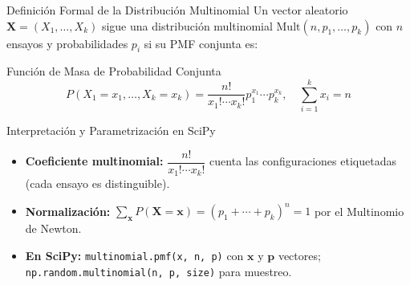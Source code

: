 \documentclass[10pt, aspectratio=169]{beamer}
\begin{document}
\begin{frame}{Definición Formal de la Distribución Multinomial}
  \footnotesize
  Un vector aleatorio $\bm{X} = (X_{1}, \dots, X_{k})$ sigue una distribución multinomial $\text{Mult}(n, p_{1}, \dots, p_{k})$ con $n$ ensayos y probabilidades $p_{i}$ si su PMF conjunta es: \pause

  \vspace{0.1cm}
  \begin{block}{Función de Masa de Probabilidad Conjunta}
    $$P(X_{1} = x_{1}, \dots, X_{k} = x_{k}) = \dfrac{n!}{x_{1}! \cdots x_{k}!} p_{1}^{x_{1}} \cdots p_{k}^{x_{k}}, \quad \sum_{i=1}^{k} x_{i} = n$$
  \end{block}

  \vspace{0.1cm}
  \pause
  \begin{alertblock}{Interpretación y Parametrización en SciPy}
    \begin{itemize}\itemsep=0.06cm
      \item \textbf{Coeficiente multinomial:} $\dfrac{n!}{x_{1}! \cdots x_{k}!}$ cuenta las configuraciones etiquetadas (cada ensayo es distinguible).
      \item \textbf{Normalización:} $\sum_{\bm{x}} P(\bm{X} = \bm{x}) = (p_{1} + \cdots + p_{k})^{n} = 1$ por el Multinomio de Newton.
      \item \textbf{En SciPy:} \texttt{multinomial.pmf(x, n, p)} con $\bm{x}$ y $\bm{p}$ vectores; \texttt{np.random.multinomial(n, p, size)} para muestreo.
    \end{itemize}
  \end{alertblock}
\end{frame}
\end{document}
